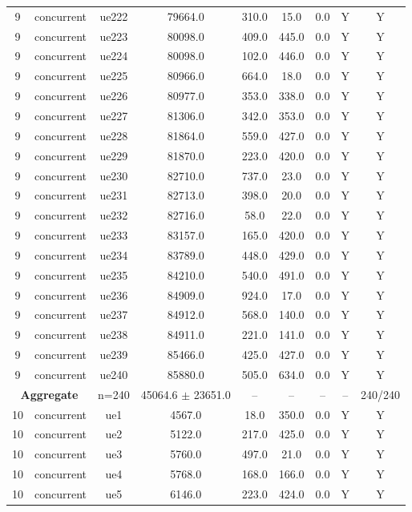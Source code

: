 \begin{table}[ht]
\begin{tabular}{|c|c|c|c|c|c|c|c|c|}
9 & concurrent & ue222 & 79664.0 & 310.0 & 15.0 & 0.0 & Y & Y \\
9 & concurrent & ue223 & 80098.0 & 409.0 & 445.0 & 0.0 & Y & Y \\
9 & concurrent & ue224 & 80098.0 & 102.0 & 446.0 & 0.0 & Y & Y \\
9 & concurrent & ue225 & 80966.0 & 664.0 & 18.0 & 0.0 & Y & Y \\
9 & concurrent & ue226 & 80977.0 & 353.0 & 338.0 & 0.0 & Y & Y \\
9 & concurrent & ue227 & 81306.0 & 342.0 & 353.0 & 0.0 & Y & Y \\
9 & concurrent & ue228 & 81864.0 & 559.0 & 427.0 & 0.0 & Y & Y \\
9 & concurrent & ue229 & 81870.0 & 223.0 & 420.0 & 0.0 & Y & Y \\
9 & concurrent & ue230 & 82710.0 & 737.0 & 23.0 & 0.0 & Y & Y \\
9 & concurrent & ue231 & 82713.0 & 398.0 & 20.0 & 0.0 & Y & Y \\
9 & concurrent & ue232 & 82716.0 & 58.0 & 22.0 & 0.0 & Y & Y \\
9 & concurrent & ue233 & 83157.0 & 165.0 & 420.0 & 0.0 & Y & Y \\
9 & concurrent & ue234 & 83789.0 & 448.0 & 429.0 & 0.0 & Y & Y \\
9 & concurrent & ue235 & 84210.0 & 540.0 & 491.0 & 0.0 & Y & Y \\
9 & concurrent & ue236 & 84909.0 & 924.0 & 17.0 & 0.0 & Y & Y \\
9 & concurrent & ue237 & 84912.0 & 568.0 & 140.0 & 0.0 & Y & Y \\
9 & concurrent & ue238 & 84911.0 & 221.0 & 141.0 & 0.0 & Y & Y \\
9 & concurrent & ue239 & 85466.0 & 425.0 & 427.0 & 0.0 & Y & Y \\
9 & concurrent & ue240 & 85880.0 & 505.0 & 634.0 & 0.0 & Y & Y \\
\multicolumn{2}{|c|}{\textbf{Aggregate}} & n=240 & 45064.6 $\pm$ 23651.0 & -- & -- & -- & -- & 240/240 \\
\hline
10 & concurrent & ue1 & 4567.0 & 18.0 & 350.0 & 0.0 & Y & Y \\
10 & concurrent & ue2 & 5122.0 & 217.0 & 425.0 & 0.0 & Y & Y \\
10 & concurrent & ue3 & 5760.0 & 497.0 & 21.0 & 0.0 & Y & Y \\
10 & concurrent & ue4 & 5768.0 & 168.0 & 166.0 & 0.0 & Y & Y \\
10 & concurrent & ue5 & 6146.0 & 223.0 & 424.0 & 0.0 & Y & Y \\

\end{tabular}
\end{table}
